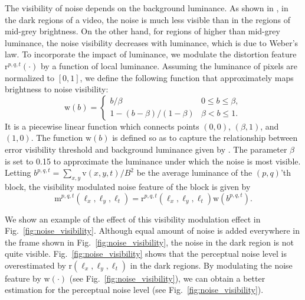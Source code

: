 \documentclass{sig-alternate}
\begin{document}
The visibility of noise depends on the background luminance. As shown in \cite{ChoLi1995,Gir1989}, in the dark regions of a video, the noise is much less visible than in the regions of mid-grey brightness. On the other hand, for regions of higher than mid-grey luminance, the noise visibility decreases with luminance, which is due to Weber's law. To incorporate the impact of luminance, we modulate the distortion feature $\mathrm{r}^{p,q,t}(\cdot)$ by a function of local luminance. Assuming the luminance of pixels are normalized to $[0,1]$, we define the following function that approximately maps brightness to noise visibility: 
\begin{equation}
\label{eq:brightness}
\mathrm{w}(b) = \begin{cases}
b/\beta & 0\leq b\leq\beta,\\
1-(b-\beta)/(1-\beta) & \beta<b\leq1.
\end{cases}
\end{equation}
It is a piecewise linear function which connects points $(0,0)$, $(\beta,1)$, and $(1,0)$. The function $\mathrm{w}(b)$ is defined so as to capture the relationship between error visibility threshold and background luminance given by \cite{ChoLi1995}. The parameter $\beta$ is set to 0.15 to approximate the luminance under which the noise is most visible. Letting $b^{p,q,t}=\sum_{x,y}{\mathrm{v}(x,y,t)}/B^2$ be the average luminance of the $(p,q)$'th block, the visibility modulated noise feature of the block is given by
\begin{equation}
\label{eq:brightness_feature}
\mathrm{m}^{p,q,t}(\ell_x,\ell_y,\ell_t) = \mathrm{r}^{p,q,t}\left(\ell_x,\ell_y,\ell_t\right)\mathrm{w}\left(b^{p,q,t}\right).
\end{equation}

We show an example of the effect of this visibility modulation effect in Fig.~\ref{fig:noise_visibility}. Although equal amount of noise is added everywhere in the frame shown in Fig.~\ref{fig:noise_visibility}, the noise in the dark region is not quite visible. Fig.~\ref{fig:noise_visibility} shows that the perceptual noise level is overestimated by $\mathrm{r}(\ell_x,\ell_y,\ell_t)$ in the dark regions. By modulating the noise feature by $\mathrm{w}(\cdot)$ (see Fig.~\ref{fig:noise_visibility}), we can obtain a better estimation for the perceptual noise level (see Fig.~\ref{fig:noise_visibility}).
\end{document}
